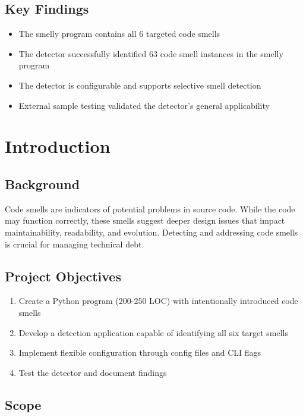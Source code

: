 \documentclass[11pt,a4paper]{article}
\begin{document}
\subsection{Key Findings}

\begin{itemize}[noitemsep]
    \item The smelly program contains all 6 targeted code smells
    \item The detector successfully identified 63 code smell instances in the smelly program
    \item The detector is configurable and supports selective smell detection
    \item External sample testing validated the detector's general applicability
\end{itemize}

\section{Introduction}

\subsection{Background}

Code smells are indicators of potential problems in source code. While the code may function correctly, these smells suggest deeper design issues that impact maintainability, readability, and evolution. Detecting and addressing code smells is crucial for managing technical debt.

\subsection{Project Objectives}

\begin{enumerate}[noitemsep]
    \item Create a Python program (200-250 LOC) with intentionally introduced code smells
    \item Develop a detection application capable of identifying all six target smells
    \item Implement flexible configuration through config files and CLI flags
    \item Test the detector and document findings
\end{enumerate}

\subsection{Scope}
\end{document}
